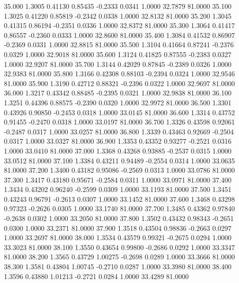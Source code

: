   35.000   1.3005   0.41130   0.85435  -0.2333   0.0341   1.0000  32.7879  81.0000
  35.100   1.3025   0.41220   0.85819  -0.2342   0.0338   1.0000  32.8132  81.0000
  35.200   1.3045   0.41315   0.86194  -0.2351   0.0336   1.0000  32.8372  81.0000
  35.300   1.3064   0.41417   0.86557  -0.2360   0.0333   1.0000  32.8600  81.0000
  35.400   1.3084   0.41532   0.86907  -0.2369   0.0331   1.0000  32.8815  81.0000
  35.500   1.3104   0.41664   0.87241  -0.2376   0.0329   1.0000  32.9018  81.0000
  35.600   1.3124   0.41825   0.87555  -0.2383   0.0327   1.0000  32.9207  81.0000
  35.700   1.3144   0.42029   0.87845  -0.2389   0.0326   1.0000  32.9383  81.0000
  35.800   1.3166   0.42308   0.88103  -0.2394   0.0324   1.0000  32.9546  81.0000
  35.900   1.3190   0.42712   0.88321  -0.2396   0.0322   1.0000  32.9697  81.0000
  36.000   1.3217   0.43342   0.88485  -0.2395   0.0321   1.0000  32.9838  81.0000
  36.100   1.3251   0.44396   0.88575  -0.2390   0.0320   1.0000  32.9972  81.0000
  36.500   1.3301   0.43926   0.90850  -0.2453   0.0318   1.0000  33.0145  81.0000
  36.600   1.3314   0.43752   0.91455  -0.2470   0.0318   1.0000  33.0197  81.0000
  36.700   1.3326   0.43598   0.92061  -0.2487   0.0317   1.0000  33.0257  81.0000
  36.800   1.3339   0.43463   0.92669  -0.2504   0.0317   1.0000  33.0327  81.0000
  36.900   1.3353   0.43352   0.93277  -0.2521   0.0316   1.0000  33.0410  81.0000
  37.000   1.3368   0.43268   0.93885  -0.2537   0.0315   1.0000  33.0512  81.0000
  37.100   1.3384   0.43211   0.94489  -0.2554   0.0314   1.0000  33.0635  81.0000
  37.200   1.3400   0.43182   0.95086  -0.2569   0.0313   1.0000  33.0786  81.0000
  37.300   1.3417   0.43180   0.95671  -0.2584   0.0311   1.0000  33.0971  81.0000
  37.400   1.3434   0.43202   0.96240  -0.2599   0.0309   1.0000  33.1193  81.0000
  37.500   1.3451   0.43243   0.96791  -0.2613   0.0307   1.0000  33.1452  81.0000
  37.600   1.3468   0.43298   0.97323  -0.2626   0.0305   1.0000  33.1740  81.0000
  37.700   1.3485   0.43362   0.97840  -0.2638   0.0302   1.0000  33.2050  81.0000
  37.800   1.3502   0.43432   0.98343  -0.2651   0.0300   1.0000  33.2371  81.0000
  37.900   1.3518   0.43504   0.98836  -0.2663   0.0297   1.0000  33.2697  81.0000
  38.000   1.3534   0.43579   0.99321  -0.2675   0.0294   1.0000  33.3023  81.0000
  38.100   1.3550   0.43654   0.99800  -0.2686   0.0292   1.0000  33.3347  81.0000
  38.200   1.3565   0.43729   1.00275  -0.2698   0.0289   1.0000  33.3666  81.0000
  38.300   1.3581   0.43804   1.00745  -0.2710   0.0287   1.0000  33.3980  81.0000
  38.400   1.3596   0.43880   1.01213  -0.2721   0.0284   1.0000  33.4289  81.0000
